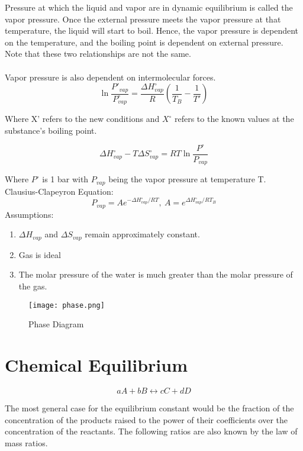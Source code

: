 \documentclass{article}
\begin{document}
Pressure at which the liquid and vapor are in dynamic equilibrium is called the vapor pressure. Once the external pressure meets the vapor pressure at that temperature, the liquid will start to boil. Hence, the vapor pressure is dependent on the temperature, and the boiling point is dependent on external pressure. Note that these two relationships are not the same. \\
\\
Vapor pressure is also dependent on intermolecular forces.\\

\[
\ln{\frac{P'_{vap}}{P^{\circ}_{vap}}} = \frac{\Delta H^{\circ}_{vap}}{R} (\frac{1}{T_B}-\frac{1}{T'})
\]

\begin{center}
Where X' refers to the new conditions and $X^{\circ}$ refers to the known values at the substance's boiling point.
\end{center}

\[
\Delta H^{\circ}_{vap} - T \Delta S^{\circ}_{vap} = RT \ln \frac{P^{\circ}}{P_{vap}}
\]

Where $P^{\circ}$ is 1 bar with $P_{vap}$ being the vapor pressure at temperature T.\\


Clausius-Clapeyron Equation:
\[
P_{vap} = Ae^{-\Delta H^{\circ}_{vap}/RT},\ A=e^{\Delta H^{\circ}_{vap}/RT_B}
\]
Assumptions: 
\begin{enumerate}
\item$\Delta H_{vap}$ and $\Delta S_{vap}$ remain approximately constant.
\item Gas is ideal
\item The molar pressure of the water is much greater than the molar pressure of the gas. 
\end{enumerate}

\begin{figure}[hbt!]
\centering
\texttt{[image: phase.png]}
\caption{Phase Diagram}
\end{figure}

\section{Chemical Equilibrium}

\[
a A + b B \leftrightarrow c C + d D
\]


The most general case for the equilibrium constant would be the fraction of the concentration of the products raised to the power of their coefficients over the concentration of the reactants. The following ratios are also known by the law of mass ratios.
\end{document}
